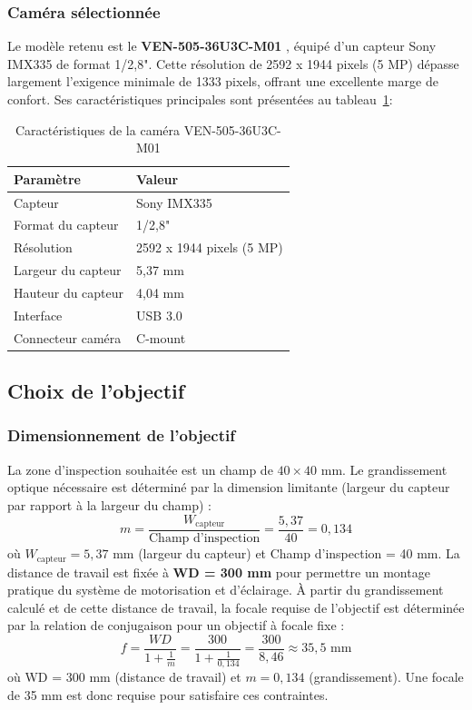 \subsubsection{Caméra sélectionnée}
Le modèle retenu est le \textbf{VEN-505-36U3C-M01} \cite{va_imaging_ven505}, équipé d'un capteur Sony IMX335 de format 1/2,8". 
Cette résolution de 2592 x 1944 pixels (5 MP) dépasse largement l'exigence minimale de 1333 pixels, offrant une excellente marge de confort. 
Ses caractéristiques principales sont présentées au tableau~\ref{tab:specs_camera}:
\begin{table}[H]
  \centering
  \caption{Caractéristiques de la caméra VEN-505-36U3C-M01}
  \label{tab:specs_camera}
  \begin{tabular}{ll}
    \toprule
    \textbf{Paramètre} & \textbf{Valeur} \\
    \midrule
    Capteur & Sony IMX335 \\
    Format du capteur & 1/2,8" \\
    Résolution & 2592 x 1944 pixels (5 MP) \\
    Largeur du capteur & 5,37 mm \\
    Hauteur du capteur & 4,04 mm \\
    Interface & USB 3.0 \\
    Connecteur caméra & C-mount \\
    \bottomrule
  \end{tabular}
\end{table} 
\subsection{Choix de l'objectif}
\subsubsection{Dimensionnement de l'objectif}
La zone d'inspection souhaitée est un champ de $40 \times 40$ mm. 
Le grandissement optique nécessaire est déterminé par la dimension limitante (largeur du capteur par rapport à la largeur du champ) :
\begin{equation}
    m = \frac{W_{\text{capteur}}}{\text{Champ d'inspection}} = \frac{5,37}{40} = 0,134
    \label{eq:grandissement}
\end{equation}
\noindent où $W_{\text{capteur}} = 5,37$ mm (largeur du capteur) et Champ d'inspection = 40 mm.
La distance de travail est fixée à \textbf{WD = 300 mm} pour permettre un montage pratique du système de motorisation et d'éclairage. 
À partir du grandissement calculé et de cette distance de travail, la focale requise de l'objectif est déterminée par la relation de conjugaison pour un objectif à focale fixe :
\begin{equation}
    f = \frac{WD}{1 + \frac{1}{m}} = \frac{300}{1 + \frac{1}{0,134}} = \frac{300}{8,46} \approx 35,5 \text{ mm}
    \label{eq:focale}
\end{equation}
\noindent où WD = 300 mm (distance de travail) et $m = 0,134$ (grandissement).
Une focale de 35 mm est donc requise pour satisfaire ces contraintes.
